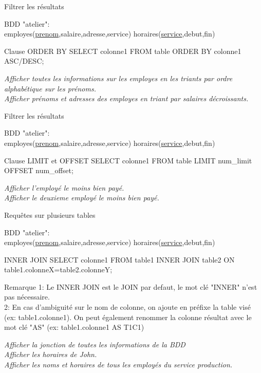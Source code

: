 \documentclass[xetex,dvipsnames]{beamer}
\begin{document}
\begin{frame}[t]{Filtrer les résultats}
\begin{small}
		BDD "atelier": \\employes(\underline{prenom},salaire,adresse,service) horaires(\underline{service},debut,fin)
\end{small}	
	\begin{alertblock}{Clause ORDER BY}
		SELECT colonne1 FROM table ORDER BY colonne1 ASC/DESC;
	\end{alertblock}
	
		\textit{Afficher toutes les informations sur les employes en les triants par ordre alphabétique sur les prénoms.}\\
		\textit{Afficher prénoms et adresses des employes en triant par salaires décroissants.}\\
\end{frame}


\begin{frame}[t]{Filtrer les résultats}
\begin{small}
		BDD "atelier": \\employes(\underline{prenom},salaire,adresse,service) horaires(\underline{service},debut,fin)
\end{small}	
	\begin{alertblock}{Clause LIMIT et OFFSET}
		SELECT colonne1 FROM table LIMIT num\_limit OFFSET num\_offset;
	\end{alertblock}
		\textit{Afficher l'employé le moins bien payé.}\\
		\textit{Afficher le deuxieme employé le moins bien payé.}\\
\end{frame}

\begin{frame}[t]{Requêtes sur plusieurs tables}
\begin{small}
		BDD "atelier": \\employes(\underline{prenom},salaire,adresse,service) horaires(\underline{service},debut,fin)
\end{small}	
	\begin{alertblock}{INNER JOIN}
		SELECT colonne1 FROM table1 INNER JOIN table2 ON table1.colonneX=table2.colonneY;
	\end{alertblock}
\begin{footnotesize}
	\begin{block}{Remarque}
	 1: Le INNER JOIN est le JOIN par defaut, le mot clé "INNER" n'est pas nécessaire.
	\\2: En cas d'ambiguité sur le nom de colonne, on ajoute en préfixe la table visé (ex: table1.colonne1). On peut également renommer la colonne résultat avec le mot clé "AS" (ex: table1.colonne1 AS T1C1)
	\end{block}
\end{footnotesize}
		
		\textit{Afficher la jonction de toutes les informations de la BDD}\\
		\textit{Afficher les horaires de John.}\\
		\textit{Afficher les noms et horaires de tous les employés du service production.}\\
\end{frame}
\end{document}
